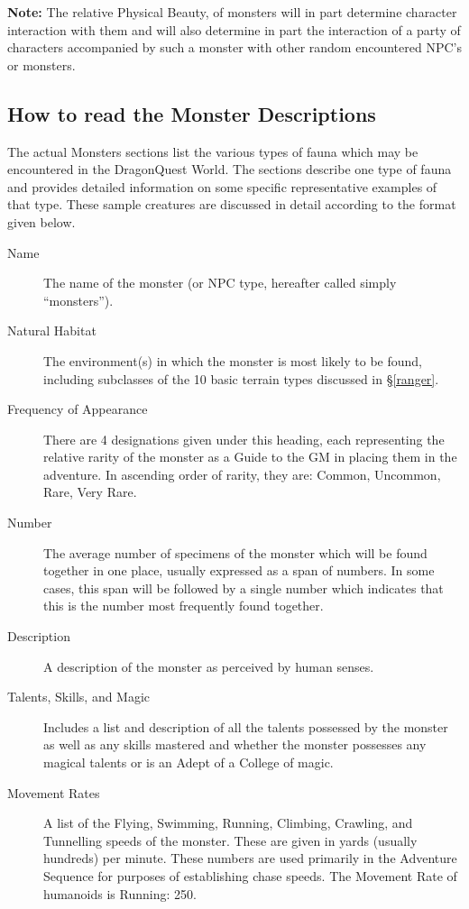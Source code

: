 \begin{multicols}{3}
\textbf{Note:} The relative Physical Beauty, of monsters will in
part determine character interaction with them and will also determine
in part the interaction of a party of characters accompanied by such a
monster with other random encountered NPC's or monsters.

\subsection{How to read the Monster Descriptions}

The actual Monsters sections list the various types of fauna which
may be encountered in the DragonQuest World.  The sections describe
one type of fauna and provides detailed information on some specific
representative examples of that type.  These sample creatures are
discussed in detail according to the format given below.

\begin{description}
\item[Name] The name of the monster (or NPC type, hereafter called
simply ``monsters'').

\item[Natural Habitat] The environment(s) in which the monster is most
likely to be found, including subclasses of the 10 basic terrain types
discussed in \S\ref{ranger}.

\item[Frequency of Appearance] There are 4 designations given under
this heading, each representing the relative rarity of the monster as
a Guide to the GM in placing them in the adventure. In ascending order
of rarity, they are: Common, Uncommon, Rare, Very Rare.

\item[Number]
The average number of specimens of the monster which will be found
together in one place, usually expressed as a span of numbers.  In
some cases, this span will be followed by a single number which
indicates that this is the number most frequently found together.

\item[Description] A description of the monster as perceived by human
senses.

\item[Talents, Skills, and Magic] Includes a list and description of
all the talents possessed by the monster as well as any skills
mastered and whether the monster possesses any magical talents or is
an Adept of a College of magic.

\item[Movement Rates] A list of the Flying, Swimming, Running,
Climbing, Crawling, and Tunnelling speeds of the monster.  These are
given in yards (usually hundreds) per minute.  These numbers are used
primarily in the Adventure Sequence for purposes of establishing chase
speeds.  The Movement Rate of humanoids is Running: 250.


\end{description}
\end{multicols}
